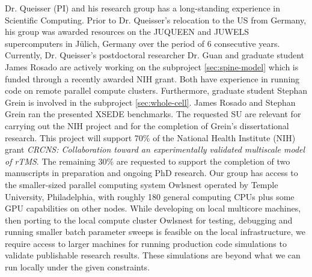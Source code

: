 Dr. Queisser (PI) and his research group has a long-standing experience in Scientific Computing. Prior to Dr. Queisser's relocation to the US from Germany, his group was awarded resources on the JUQUEEN and JUWELS supercomputers in J\"ulich, Germany over the period of 6 consecutive years. Currently, Dr. Queisser's postdoctoral researcher Dr. Guan and graduate student James Rosado are actively working on the subproject \ref{sec:spine-model} which is funded through a recently awarded NIH grant. Both have experience in running code on remote parallel compute clusters. Furthermore, graduate student Stephan Grein is involved in the subproject \ref{sec:whole-cell}. James Rosado and Stephan Grein ran the presented XSEDE benchmarks. The requested SU are relevant for carrying out the NIH project and for the completion of Grein's dissertational research. This project will support 70\% of the National Health Institute (NIH) grant \emph{CRCNS: Collaboration toward an experimentally validated multiscale model of rTMS}. The remaining 30\% are requested to support the completion of two manuscripts in preparation and ongoing PhD research. 
Our group has access to the smaller-sized parallel computing system Owlsnest operated by Temple University, Philadelphia, with roughly 180 general computing CPUs plus some GPU capabilities on other nodes. While developing on local multicore machines, then porting to the local compute cluster Owlsnest for testing, debugging and running smaller batch parameter sweeps is feasible on the local infrastructure, we require access to larger machines for running production code simulations to validate publishable research results. These simulations are beyond what we can run locally under the given constraints. 
